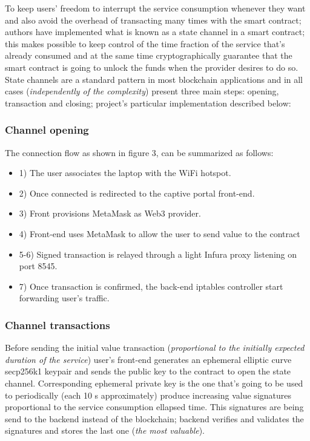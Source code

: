 \documentclass[12pt]{amsart}
\begin{document}
\begin{multicols}{2}
\vspace{0.35cm}

To keep users' freedom to interrupt the service consumption
whenever they want and also avoid the overhead of transacting
many times with the smart contract; authors have implemented
what is known as a state channel in a smart contract; this
makes possible to keep control of the time fraction of the service
that's already consumed and at the same time cryptographically
guarantee that the smart contract is going to unlock the funds
when the provider desires to do so. State channels are a
standard pattern in most blockchain applications and in all cases
(\textit{independently of the complexity}) present three main
steps: opening, transaction and closing; project's particular implementation
described below:

\subsubsection{Channel opening}
The connection flow as shown in figure 3, can be summarized
as follows:

\begin{itemize}
\item[] 1) The user associates the laptop with the WiFi hotspot.
\item[] 2) Once connected is redirected to the captive portal front-end.
\item[] 3) Front provisions MetaMask as Web3 provider.
\item[] 4) Front-end uses MetaMask to allow the user
  to send value to the contract
\item[] 5-6) Signed transaction is relayed through a light Infura proxy listening
  on port 8545.
\item[] 7) Once transaction is confirmed, the back-end iptables controller
  start forwarding user's traffic.
\end{itemize}


\subsubsection{Channel transactions}
Before sending the initial value transaction (\textit{proportional to
  the initially expected duration of the service})
user's front-end generates an ephemeral elliptic curve
secp256k1 keypair and sends the public key to the contract to open the state channel.
Corresponding ephemeral private key is the one that's going to be used
to periodically (each 10 s approximately)
produce increasing value signatures proportional to the
service consumption ellapsed time. This signatures are being send to the
backend instead of the blockchain; backend verifies and validates the
signatures and stores the last one (\textit{the most valuable}).


\end{multicols}
\end{document}
